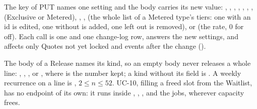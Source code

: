 {\sloppy The key of PUT  names one setting and the body carries its new value: , , , , , , ,  (Exclusive or Metered), , ,  (the whole list of a Metered type's tiers: one with an id is edited, one without is added, one left out is removed), or  (the rate, 0 for off). Each call is one  and one change-log row, answers the new settings, and affects only Quotes not yet locked and events after the change ().

The body of a Release names its kind, so an empty body never releases a whole line: , , , or , where  is the number kept; a kind without its field is . A weekly recurrence on a line is , $2 \le n \le 52$. UC-10, filling a freed slot from the Waitlist, has no endpoint of its own: it runs inside , , , and the jobs, wherever capacity frees.\par}
